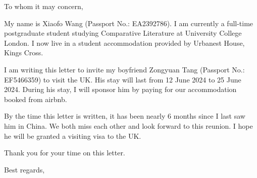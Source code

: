 \documentclass{letter}
\date{Feburary 24, 2023}
\begin{document}
\begin{letter}{}

\opening{To whom it may concern,}

My name is Xiaofo Wang (Passport No.: EA2392786). I am currently a full-time postgraduate student studying Comparative Literature at University College London. I now live in a student accommodation provided by Urbanest House, Kings Cross. 

I am writing this letter to invite my boyfriend Zongyuan Tang (Passport No.: EF5466359) to visit the UK. His stay will last from 12 June 2024 to 25 June 2024. During his stay, I will sponsor him by paying for our accommodation booked from airbnb.

By the time this letter is written, it has been nearly 6 months since I last saw him in China. We both miss each other and look forward to this reunion. I hope he will be granted a visiting visa to the UK.

Thank you for your time on this letter.

\closing{Best regards,\\
\\
}

    
    
    
\end{letter}
\end{document}
